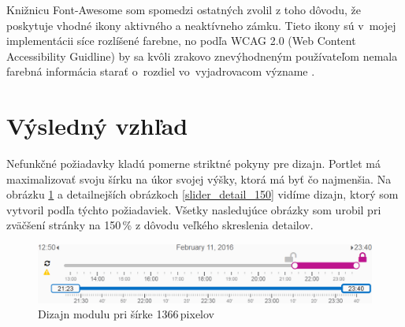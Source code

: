 \documentclass[
  printed, %
  twoside, %
  notable,   %
  nolof,   %
  nolot,   %
]{fithesis3}
\begin{document}
Knižnicu Font-Awesome som spomedzi ostatných zvolil z toho dôvodu, že poskytuje vhodné ikony aktivného a neaktívneho zámku. Tieto ikony sú v~mojej implementácii síce rozlíšené farebne, no podľa WCAG 2.0 (Web Content Accessibility Guidline) by sa kvôli zrakovo znevýhodneným používateľom nemala farebná informácia starať o~rozdiel vo~vyjadrovacom význame \cite[sekcia~1.4]{caldwell2008web}.

\section{Výsledný vzhľad}
\label{design_created}
Nefunkčné požiadavky kladú pomerne striktné pokyny pre dizajn. Portlet má maximalizovať svoju šírku na úkor svojej výšky, ktorá má byť čo najmenšia. Na obrázku \ref{slider_150} a detailnejších obrázkoch \ref{slider_detail_150} vidíme dizajn, ktorý som vytvoril podľa týchto požiadaviek. Všetky nasledujúce obrázky som urobil pri zväčšení stránky na 150\,\% z dôvodu veľkého skreslenia detailov.

\begin{figure}[H]
	\center
	\includegraphics[width=1.0\linewidth]{slider_150}
	\caption{Dizajn modulu pri šírke 1366\,pixelov}
	\label{slider_150}
\end{figure}
\end{document}
